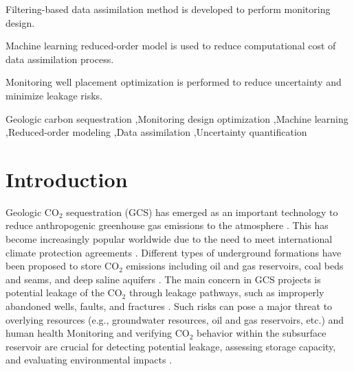 \documentclass[a4paper,fleqn]{cas-sc}
\begin{document}
\begin{highlights}
\item Filtering-based data assimilation method is developed to perform monitoring design.
\item Machine learning reduced-order model is used to reduce computational cost of data assimilation process.
\item Monitoring well placement optimization is performed to reduce uncertainty and minimize leakage risks.
\end{highlights}

\begin{keywords}
Geologic carbon sequestration \sep Monitoring design optimization \sep Machine learning \sep Reduced-order modeling \sep Data assimilation \sep Uncertainty quantification
\end{keywords}


\maketitle

\section{Introduction}
Geologic CO$_2$ sequestration (GCS) has emerged as an important technology to reduce anthropogenic greenhouse gas emissions to the atmosphere \citep{Metz2005,Michael2010,Kopp2010867, Goodman2013329, Castelletto2013570, Li2015389, Levine201681, krevorCCS2018}. This has become increasingly popular worldwide due to the need to meet international climate protection agreements \citep{Energy20202010EuropeanCommission, Unitednations2015AgreementP}. Different types of underground formations have been proposed to store CO$_2$ emissions including oil and gas reservoirs, coal beds and seams, and deep saline aquifers \citep{Dai2016CO2Sites}. The main concern in GCS projects is potential leakage of the CO$_2$ through leakage pathways, such as improperly abandoned wells, faults, and fractures \citep{Metz2005, Harp2016150, Song2012, Sifuentes2009148, Nordbotten2012234}. Such risks can pose a major threat to overlying resources (e.g., groundwater resources, oil and gas reservoirs, etc.) and human health \citep{Benson2003, Keating2016319} Monitoring and verifying CO$_2$ behavior within the subsurface reservoir are crucial for detecting potential leakage, assessing storage capacity, and evaluating environmental impacts \citep{Condor20114036, DeLary201550, Li2016249}.
\end{document}
